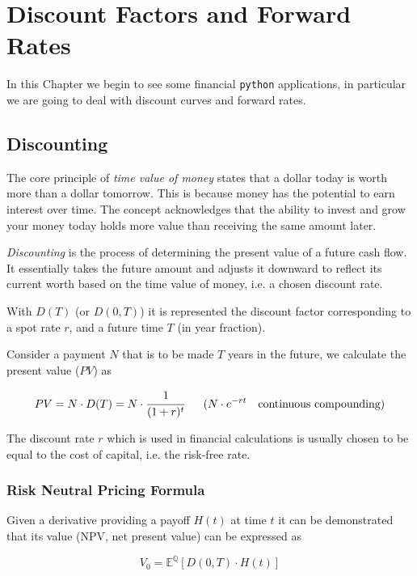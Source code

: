 \chapter{Discount Factors and Forward Rates}

In this Chapter we begin to see some financial \texttt{python} applications, in particular we are going to deal with discount curves and forward rates.

\section{Discounting}
\label{discount-factors}

The core principle of \emph{time value of money} states that a dollar today is worth more than a dollar tomorrow. This is because money has the potential to earn interest over time.
The concept acknowledges that the ability to invest and grow your money today holds more value than receiving the same amount later.

\emph{Discounting} is the process of determining the present value of a future cash flow. It essentially takes the future amount and adjusts it downward to reflect its current worth based on the time value of money, i.e. a chosen discount rate.

With $D(T)$ (or $D(0,T)$) it is represented the discount factor corresponding to a spot rate $r$, and a future time $T$ (in year fraction). 

Consider a payment $N$ that is to be made $T$ years in the future, we calculate the present value ($PV$) as

\begin{equation}
PV = N\cdot D(T) = N \cdot \cfrac{1}{(1 + r)^t}~~~~~
(N \cdot e^{-rt}~~~\text{continuous compounding})
\label{eq:discount_factor}
\end{equation}

The discount rate $r$ which is used in financial calculations is usually chosen to be equal to the cost of capital, i.e. the risk-free rate.

\subsection{Risk Neutral Pricing Formula}
\label{sec:risk_neutral_pricing}
Given a derivative providing a payoff $H(t)$ at time $t$ it can be demonstrated that its value (NPV, net present value) can be expressed as

\begin{equation}
V_0 = \mathbb{E}^{\mathbb{Q}} \left[ D(0,T)\cdot H(t) \right]
\end{equation}

